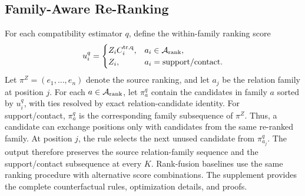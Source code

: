 \subsection{Family-Aware Re-Ranking}
For each compatibility estimator $q$, define the within-family ranking score
\begin{equation}
u_i^q=\begin{cases}
Z_iC_i^{\rm tr,q}, & a_i\in\mathcal A_{\rm rank},\\
Z_i, & a_i=\mathrm{support/contact}.
\end{cases}
\end{equation}
Let $\pi^Z=(e_1,\ldots,e_n)$ denote the source ranking, and let $a_j$ be the relation family at position $j$. For each $a\in\mathcal A_{\rm rank}$, let $\pi_a^q$ contain the candidates in family $a$ sorted by $u_i^q$, with ties resolved by exact relation-candidate identity. For support/contact, $\pi_a^q$ is the corresponding family subsequence of $\pi^Z$. Thus, a candidate can exchange positions only with candidates from the same re-ranked family. At position $j$, the rule selects the next unused candidate from $\pi_{a_j}^q$. The output therefore preserves the source relation-family sequence and the support/contact subsequence at every $K$. Rank-fusion baselines use the same ranking procedure with alternative score combinations. The supplement provides the complete counterfactual rules, optimization details, and proofs.
